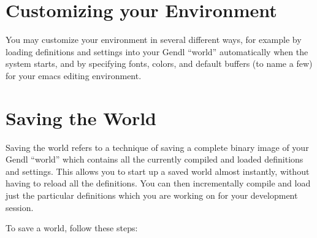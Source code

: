 \documentclass [11pt]{book}
\begin{document}
\section{Customizing your Environment}

\label{sec:customizingyourenvironment}

 You may customize your environment in several different ways,
for example by loading definitions and settings into your Gendl
``world'' automatically when the system starts, and by specifying
fonts, colors, and default buffers (to name a few) for your emacs
editing environment.

\section{Saving the World}

\label{sec:savingtheworld}

 Saving the world refers to a technique of saving a complete
binary image of your Gendl ``world'' which contains all the currently
compiled and loaded definitions and settings.  This allows you to
start up a saved world almost instantly, without having to reload all
the definitions. You can then incrementally compile and load just the
particular definitions which you are working on for your development
session.

To save a world, follow these steps:
\end{document}
